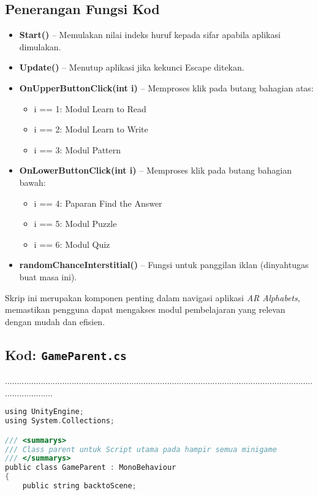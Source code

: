 \begin{itemize}
\begin{itemize}
\begin{itemize}
\begin{itemize}
\begin{itemize}
\begin{itemize}
\begin{itemize}
\begin{itemize}
\begin{flushleft}
\subsection*{Penerangan Fungsi Kod}

\begin{itemize}
  \item \textbf{Start()} -- Memulakan nilai indeks huruf kepada sifar apabila aplikasi dimulakan.
  \item \textbf{Update()} -- Menutup aplikasi jika kekunci Escape ditekan.
  \item \textbf{OnUpperButtonClick(int i)} -- Memproses klik pada butang bahagian atas:
  \begin{itemize}
    \item i == 1: Modul Learn to Read
    \item i == 2: Modul Learn to Write
    \item i == 3: Modul Pattern
  \end{itemize}
  \item \textbf{OnLowerButtonClick(int i)} -- Memproses klik pada butang bahagian bawah:
  \begin{itemize}
    \item i == 4: Paparan Find the Answer
    \item i == 5: Modul Puzzle
    \item i == 6: Modul Quiz
  \end{itemize}
  \item \textbf{randomChanceInterstitial()} -- Fungsi untuk panggilan iklan (dinyahtugas buat masa ini).
\end{itemize}

\bigskip

Skrip ini merupakan komponen penting dalam navigasi aplikasi \textit{AR Alphabets}, memastikan pengguna dapat mengakses modul pembelajaran yang relevan dengan mudah dan efisien.
\clearpage

\subsection*{Kod: \texttt{GameParent.cs}}
.....................................................................................................................................................
\begin{lstlisting}[language=C,caption={Kod Skrip Game Parent bagi AR Alphabets},label={lst:gameparent-script}]
using UnityEngine;
using System.Collections;

/// <summarys>
/// Class parent untuk Script utama pada hampir semua minigame
/// </summarys>
public class GameParent : MonoBehaviour
{
    public string backtoScene;


\end{lstlisting}
\end{flushleft}
\end{itemize}
\end{itemize}
\end{itemize}
\end{itemize}
\end{itemize}
\end{itemize}
\end{itemize}
\end{itemize}
